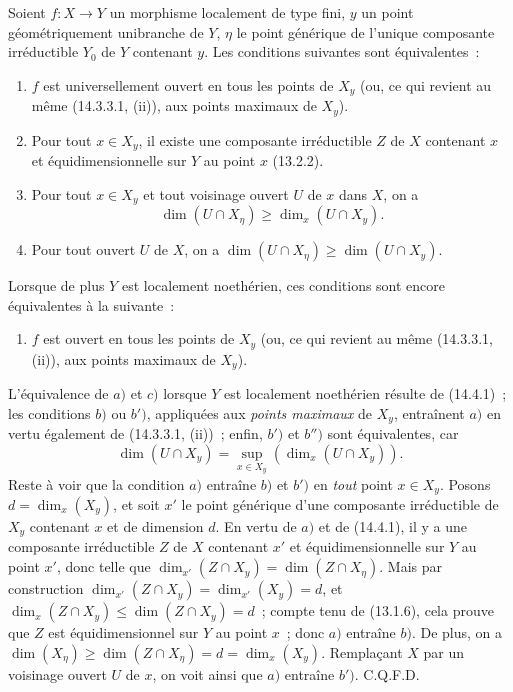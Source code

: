 \begin{corollary}[14.4.2]
\label{IV.14.4.2-fr}
Soient $f:X\to Y$ un morphisme localement de type fini, $y$ un point
géométriquement unibranche de $Y$, $\eta$ le point générique de l'unique composante
irréductible $Y_0$ de $Y$ contenant $y$. Les conditions suivantes sont
équivalentes~:
\begin{enumerate}[label=\emph{\alph*)}]
  \item $f$ est universellement ouvert en tous les points de $X_y$ \textup{(ou, ce qui
  revient au même (14.3.3.1, (ii)), aux points maximaux de $X_y$)}.
  \item Pour tout $x\in X_y$, il existe une composante irréductible $Z$ de $X$
  contenant $x$ et équidimensionnelle sur $Y$ au point $x$ \textup{(13.2.2)}.
  \item[\textup{b$'$)}] Pour tout $x\in X_y$ et tout voisinage ouvert $U$ de $x$ dans $X$,
  on a
  \[
  \dim(U\cap X_\eta)\geq\dim_x(U\cap X_y).
  \]
  \item[\textup{b$''$)}] Pour tout ouvert $U$ de $X$, on a
  $\dim(U\cap X_\eta)\geq\dim(U\cap X_y)$.
\end{enumerate}


Lorsque de plus $Y$ est localement noethérien, ces conditions sont encore
équivalentes à la suivante~:
\begin{enumerate}[label=\emph{\alph*)}]
  \item[\textup{c)}] $f$ est ouvert en tous les points de $X_y$ \textup{(ou, ce qui revient au même
  (14.3.3.1, (ii)), aux points maximaux de $X_y$)}.
\end{enumerate}
\end{corollary}

L'équivalence de $a)$ et $c)$ lorsque $Y$ est localement noethérien résulte de
(14.4.1)~; les conditions $b)$ ou $b')$, appliquées aux \emph{points maximaux} de
$X_y$, entraînent $a)$ en vertu également de (14.3.3.1, (ii))~; enfin, $b')$ et
$b'')$ sont équivalentes, car
\[
  \dim(U\cap X_y)=\sup_{x\in X_y}(\dim_x(U\cap X_y)).
\]
Reste à voir que la condition $a)$ entraîne $b)$ et $b')$ en \emph{tout} point
$x\in X_y$. Posons $d=\dim_x(X_y)$, et soit $x'$ le point générique d'une
composante irréductible de $X_y$ contenant $x$ et de dimension $d$. En vertu de
$a)$ et de (14.4.1), il y a une composante irréductible $Z$ de $X$ contenant $x'$
et équidimensionnelle sur $Y$ au point $x'$, donc telle que
$\dim_{x'}(Z\cap X_y)=\dim(Z\cap X_\eta)$. Mais par construction
$\dim_{x'}(Z\cap X_y)=\dim_{x'}(X_y)=d$, et
$\dim_x(Z\cap X_y)\leq\dim(Z\cap X_y)=d$~; compte tenu de (13.1.6), cela prouve
que $Z$ est équidimensionnel sur $Y$ au point $x$~; donc $a)$ entraîne $b)$. De
plus, on a $\dim(X_\eta)\geq\dim(Z\cap X_\eta)=d=\dim_x(X_y)$. Remplaçant $X$ par
un voisinage ouvert $U$ de $x$, on voit ainsi que $a)$ entraîne $b')$. C.Q.F.D.

